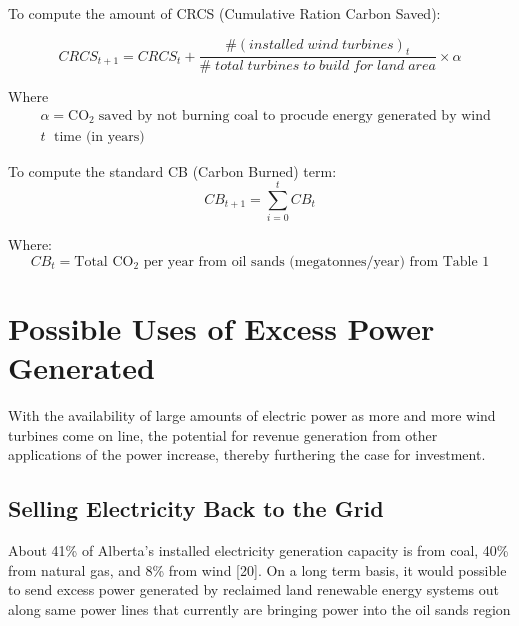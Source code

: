 \documentclass[11pt]{article}
\begin{document}
To compute the amount of CRCS (Cumulative Ration Carbon Saved):

\begin{displaymath}
CRCS_{t+1} = CRCS_t + \frac{\# (installed \;wind\; turbines)_t}{\# \;total \; turbines \; to\; build \; for \; land \; area} \times \alpha
\end{displaymath}

Where
\begin{displaymath}
\begin{split}
& \alpha =  \text{CO}_2 \;\text{saved by not burning coal to procude energy generated by wind}\\
& t \; \text{ time (in years)}
\end{split}
\end{displaymath}

To compute the standard CB (Carbon Burned) term: 
\begin{displaymath}
CB_{t+1} = \sum_{i=0}^{t} CB_t
\end{displaymath}

Where:
\begin{displaymath}
CB_t = \text{Total CO$_2$ per year from oil sands (megatonnes/year) from Table 1}
\end{displaymath}


\section{Possible Uses of Excess Power Generated}

With the availability of large amounts of electric power as more and more wind turbines come on line, the potential for revenue generation from other applications of the power increase, thereby furthering the case for investment.

\subsection{Selling Electricity Back to the Grid}

About 41\% of Alberta’s installed electricity generation capacity is from coal, 40\% from natural gas, and 8\% from wind [20]. On a long term basis, it would possible to send excess power generated by reclaimed land renewable energy systems out along same power lines that currently are bringing power into the oil sands region
\end{document}
